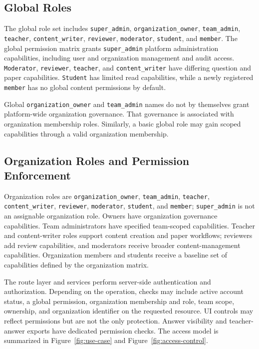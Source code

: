 \subsection{Global Roles}

The global role set includes \texttt{super\_admin}, \texttt{organization\_owner}, \texttt{team\_admin}, \texttt{teacher}, \texttt{content\_writer}, \texttt{reviewer}, \texttt{moderator}, \texttt{student}, and \texttt{member}. The global permission matrix grants \texttt{super\_admin} platform administration capabilities, including user and organization management and audit access. \texttt{Moderator}, \texttt{reviewer}, \texttt{teacher}, and \texttt{content\_writer} have differing question and paper capabilities. \texttt{Student} has limited read capabilities, while a newly registered \texttt{member} has no global content permissions by default.

Global \texttt{organization\_owner} and \texttt{team\_admin} names do not by themselves grant platform-wide organization governance. That governance is associated with organization membership roles. Similarly, a basic global role may gain scoped capabilities through a valid organization membership.

\subsection{Organization Roles and Permission Enforcement}

Organization roles are \texttt{organization\_owner}, \texttt{team\_admin}, \texttt{teacher}, \texttt{content\_writer}, \texttt{reviewer}, \texttt{moderator}, \texttt{student}, and \texttt{member}; \texttt{super\_admin} is not an assignable organization role. Owners have organization governance capabilities. Team administrators have specified team-scoped capabilities. Teacher and content-writer roles support content creation and paper workflows; reviewers add review capabilities, and moderators receive broader content-management capabilities. Organization members and students receive a baseline set of capabilities defined by the organization matrix.

The route layer and services perform server-side authentication and authorization. Depending on the operation, checks may include active account status, a global permission, organization membership and role, team scope, ownership, and organization identifier on the requested resource. UI controls may reflect permissions but are not the only protection. Answer visibility and teacher-answer exports have dedicated permission checks. The access model is summarized in Figure~\ref{fig:use-case} and Figure~\ref{fig:access-control}.

